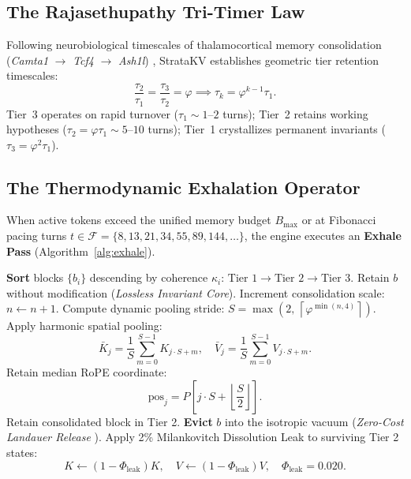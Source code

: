 \documentclass[11pt,letterpaper]{article}
\theoremstyle{definition}
\begin{document}
\subsection{The Rajasethupathy Tri-Timer Law}
Following neurobiological timescales of thalamocortical memory consolidation (\emph{Camta1} $\to$ \emph{Tcf4} $\to$ \emph{Ash1l}) \cite{rajasethupathy2025, barteau2026phiphase}, StrataKV establishes geometric tier retention timescales:
\begin{equation}
    \frac{\tau_2}{\tau_1} = \frac{\tau_3}{\tau_2} = \varphi \implies \tau_k = \varphi^{k-1} \tau_1.
\end{equation}
Tier~3 operates on rapid turnover ($\tau_1 \sim 1\text{--}2$ turns); Tier~2 retains working hypotheses ($\tau_2 = \varphi \tau_1 \sim 5\text{--}10$ turns); Tier~1 crystallizes permanent invariants ($\tau_3 = \varphi^2 \tau_1$).

\subsection{The Thermodynamic Exhalation Operator}
When active tokens exceed the unified memory budget $B_{\text{max}}$ or at Fibonacci pacing turns $t \in \mathcal{F} = \{8, 13, 21, 34, 55, 89, 144, \dots\}$, the engine executes an \textbf{Exhale Pass} (Algorithm~\ref{alg:exhale}).

\begin{algorithm}[H]
\caption{The StrataKV Thermodynamic Exhale Pass}
\label{alg:exhale}
\begin{algorithmic}[1]
\STATE \textbf{Sort} blocks $\{b_i\}$ descending by coherence $\kappa_i$: $\text{Tier 1} \to \text{Tier 2} \to \text{Tier 3}$.
        \STATE Retain $b$ without modification (\textit{Lossless Invariant Core}).
            \STATE Increment consolidation scale: $n \leftarrow n + 1$.
            \STATE Compute dynamic pooling stride: $S = \max\left(2, \, \left\lceil \varphi^{\min(n, 4)} \right\rceil \right)$.
            \STATE Apply harmonic spatial pooling:
            $$\bar{K}_j = \frac{1}{S}\sum_{m=0}^{S-1} K_{j \cdot S + m}, \quad \bar{V}_j = \frac{1}{S}\sum_{m=0}^{S-1} V_{j \cdot S + m}.$$
            \STATE Retain median RoPE coordinate:
            $$\text{pos}_j = P\left[ j \cdot S + \left\lfloor \frac{S}{2} \right\rfloor \right].$$
        \ENDIF
        \STATE Retain consolidated block in Tier 2.
    \ELSE
        \STATE \textbf{Evict} $b$ into the isotropic vacuum (\textit{Zero-Cost Landauer Release} \cite{landauer1961}).
    \ENDIF
\ENDFOR
\STATE Apply 2\% Milankovitch Dissolution Leak to surviving Tier 2 states:
$$K \leftarrow (1 - \Phi_{\text{leak}}) K, \quad V \leftarrow (1 - \Phi_{\text{leak}}) V, \quad \Phi_{\text{leak}} = 0.020.$$
\end{algorithmic}
\end{algorithm}
\end{document}
